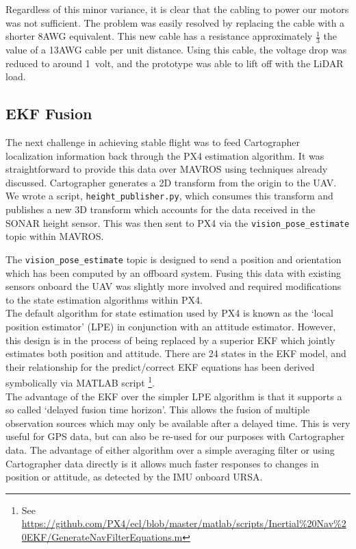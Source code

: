 \documentclass[capstone_report.tex]{subfiles}
\begin{document}
Regardless of this minor variance, it is clear that the cabling to power our motors was not sufficient. The problem was easily resolved by replacing the cable with a shorter 8AWG equivalent. This new cable has a resistance approximately $\frac{1}{3}$ the value of a 13AWG cable per unit distance. Using this cable, the voltage drop was reduced to around \SI{1}{volt}, and the prototype was able to lift off with the LiDAR load.

\subsection{EKF Fusion}
The next challenge in achieving stable flight was to feed Cartographer localization information back through the PX4 estimation algorithm. It was straightforward to provide this data over MAVROS using techniques already discussed. Cartographer generates a 2D transform from the origin to the UAV. We wrote a script, \texttt{height\_publisher.py}, which consumes this transform and publishes a new 3D transform which accounts for the data received in the SONAR height sensor. This was then sent to PX4 via the \texttt{vision\_pose\_estimate} topic within MAVROS. 

The \texttt{vision\_pose\_estimate} topic is designed to send a position and orientation which has been computed by an offboard system. Fusing this data with existing sensors onboard the UAV was slightly more involved and required modifications to the state estimation algorithms within PX4. \\

The default algorithm for state estimation used by PX4 is known as the `local position estimator' (LPE) in conjunction with an attitude estimator. However, this design is in the process of being replaced by a superior EKF which jointly estimates both position and attitude. There are 24 states in the EKF model, and their relationship for the predict/correct EKF equations has been derived symbolically via MATLAB script \footnote{See \url{https://github.com/PX4/ecl/blob/master/matlab/scripts/Inertial\%20Nav\%20EKF/GenerateNavFilterEquations.m}}.\\

The advantage of the EKF over the simpler LPE algorithm is that it supports a so called `delayed fusion time horizon'. This allows the fusion of multiple observation sources which may only be available after a delayed time. This is very useful for GPS data, but can also be re-used for our purposes with Cartographer data. The advantage of either algorithm over a simple averaging filter or using Cartographer data directly is it allows much faster responses to changes in position or attitude, as detected by the IMU onboard URSA. \\
\end{document}
